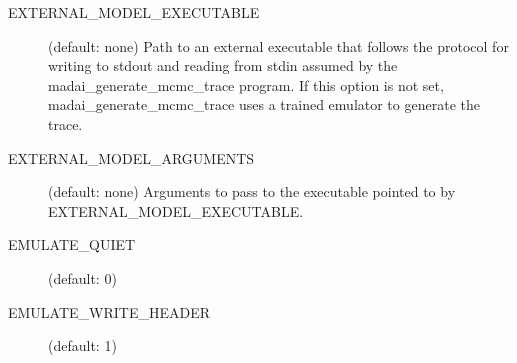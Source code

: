 \begin{description}
    \item[EXTERNAL\_MODEL\_EXECUTABLE] (default: none) Path to an external executable that follows the protocol for writing to stdout and reading from stdin assumed by the madai\_generate\_mcmc\_trace program. If this option is not set, madai\_generate\_mcmc\_trace uses a trained emulator to generate the trace.
    \item[EXTERNAL\_MODEL\_ARGUMENTS] (default: none) Arguments to pass to the executable pointed to by EXTERNAL\_MODEL\_EXECUTABLE.
    \item[EMULATE\_QUIET] (default: 0)
    \item[EMULATE\_WRITE\_HEADER] (default: 1)
\end{description}

